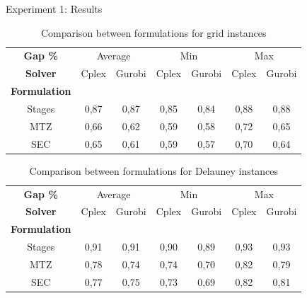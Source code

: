 \documentclass[slidestop,usepdftitle=false,10pt]{beamer}
\begin{document}
	\begin{frame}{Experiment 1: Results}
		\renewcommand{\arraystretch}{0.7}
        \begin{table}[!h]
        \caption{Comparison between formulations for grid instances}
        \centering
        \footnotesize
        \begin{tabular}{c | c c | c c | c c}
        \hline\hline
        \textbf{Gap \%} & \multicolumn{2}{c}{Average} &  \multicolumn{2}{c}{Min} &  \multicolumn{2}{c}{Max} \\
        \textbf{Solver} &Cplex &Gurobi &Cplex &Gurobi  &Cplex &Gurobi \\
        \hline
        \textbf{Formulation} & & & & & &\\
        Stages & 0,87 &	0,87 &	0,85 &	0,84 &	0,88 &	0,88\\
        MTZ	 & 0,66 &	0,62 &	0,59 &	0,58 &	0,72 &	0,65\\
        SEC	& 0,65 &	0,61 &	0,59 &	0,57 &	0,70 &	0,64\\
            \hline
        \end{tabular}
        \label{table:tab1}
        \end{table}
        
        \renewcommand{\arraystretch}{0.7}
        \begin{table}[!h]
        \caption{Comparison between formulations for Delauney instances}
        \centering
        \footnotesize
        \begin{tabular}{c | c c | c c | c c}
        \hline\hline
        \textbf{Gap \%} & \multicolumn{2}{c}{Average} &  \multicolumn{2}{c}{Min} &  \multicolumn{2}{c}{Max} \\
        \textbf{Solver} &Cplex &Gurobi &Cplex &Gurobi  &Cplex &Gurobi \\
        \hline
        \textbf{Formulation} & & & & & &\\
        Stages &	0,91 &	0,91 &	0,90 &	0,89 &	0,93 &	0,93\\
        MTZ	& 0,78 &	0,74 &	0,74 &	0,70 &	0,82 &	0,79\\
        SEC	& 0,77 &	0,75 &	0,73 &	0,69 &	0,82 &	0,81\\
            \hline
        \end{tabular}
        \label{table:tab2}
        \end{table}
	    
	\end{frame}
	
\end{document}
